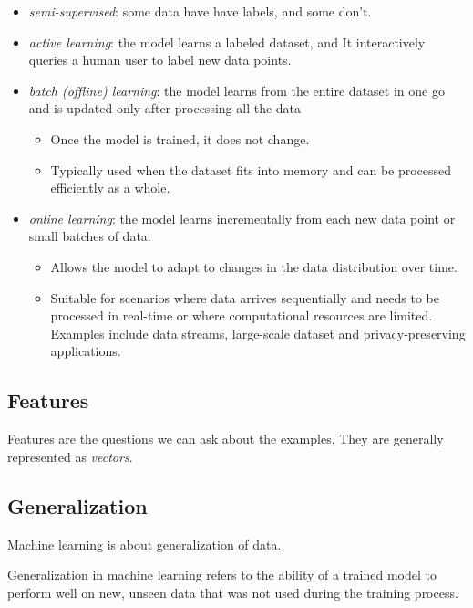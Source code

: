 \documentclass[11pt]{article}
\begin{document}
\begin{itemize}
\tightlist
\item
  \emph{semi-supervised}: some data have have labels, and some don't.
\item
  \emph{active learning}: the model learns a labeled dataset, and It
  interactively queries a human user to label new data points.
\item
  \emph{batch (offline) learning}: the model learns from the entire
  dataset in one go and is updated only after processing all the data

  \begin{itemize}
  \tightlist
  \item
    Once the model is trained, it does not change.
  \item
    Typically used when the dataset fits into memory and can be
    processed efficiently as a whole.
  \end{itemize}
\item
  \emph{online learning}: the model learns incrementally from each new
  data point or small batches of data.

  \begin{itemize}
  \tightlist
  \item
    Allows the model to adapt to changes in the data distribution over
    time.
  \item
    Suitable for scenarios where data arrives sequentially and needs to
    be processed in real-time or where computational resources are
    limited. Examples include data streams, large-scale dataset and
    privacy-preserving applications.
  \end{itemize}
\end{itemize}

\subsection{Features}\label{features}

Features are the questions we can ask about the examples. They are
generally represented as \emph{vectors}.

\subsection{Generalization}\label{generalization}

Machine learning is about generalization of data.

Generalization in machine learning refers to the ability of a trained
model to perform well on new, unseen data that was not used during the
training process.
\end{document}
